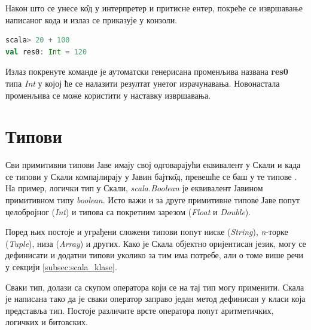 \documentclass[12pt,oneside]{memoir}
\begin{document}
Након што се унесе к\^{о}д у интерпретер и притисне ентер, покреће се извршавање написаног кода и излаз се приказује у конзоли.

\begin{lstlisting}[language=Scala, caption={Пример извршавања кода у интерпретеру}, label={lst:scala_interpreter_code_example}]
scala> 20 + 100
val res0: Int = 120
\end{lstlisting}

Излаз покренуте команде је аутоматски генерисана променљива названа \textbf{res0} типа \textit{Int} у којој ће се налазити резултат унетог израчунавања. Новонастала променљива се може користити у наставку извршавања.



%

\section{Типови}
\label{sec:scala_tip}

Сви примитивни типови Јаве имају свој одговарајући еквивалент у Скали и када се типови у Скали компајлирају у Јавин бајтк\^{о}д, превешће се баш у те типове \cite{scala_prog}. На пример, логички тип у Скали, \textit{scala.Boolean} је еквивалент Јавином примитивном типу \textit{boolean}. Исто важи и за друге примитивне типове Јаве попут целобројног (\textit{Int}) и типова са покретним зарезом (\textit{Float} и \textit{Double}).

Поред њих постоје и уграђени сложени типови попут ниске (\textit{String}), \textit{n}-торке (\textit{Tuple}), низа (\textit{Array}) и других. Како је Скала објектно оријентисан језик, могу се дефинисати и додатни типови уколико за тим има потребе, али о томе више речи у секцији \ref{subsec:scala_klase}.

Сваки тип, долази са скупом оператора који се на тај тип могу применити. Скала је написана тако да је сваки оператор заправо један метод дефинисан у класи која представља тип. Постоје различите врсте оператора попут аритметичких, логичких и битовских.
\end{document}
